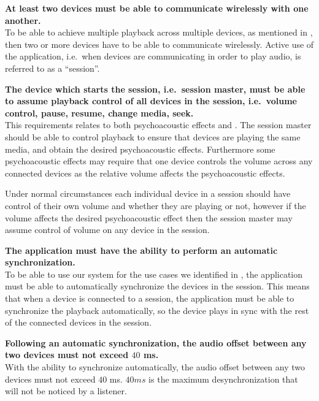 \begin{eletterate}
    \item\label{req:wireless} \textbf{At least two devices must be able to communicate wirelessly with one another.} \hfill\\
        To be able to achieve multiple playback across multiple devices, as mentioned in ,
        then two or more devices have to be able to communicate wirelessly.
        Active use of the application, i.e.~when devices are communicating in order to play audio, is referred to as a ``session''.

    \item\label{req:host_control} \textbf{The device which starts the session, i.e.~session master, must be able to assume playback control of all devices in the session, i.e.~volume control, pause, resume, change media, seek.} \hfill\\
        This requirements relates to both psychoacoustic effects and .
        The session master should be able to control playback to ensure that devices are playing the same media, and obtain the desired psychoacoustic effects.
        Furthermore some psychoacoustic effects may require that one device controls the volume across any connected devices as the relative volume affects the psychoacoustic effects.

        Under normal circumstances each individual device in a session should have control of their own volume and whether they are playing or not, however if the volume affects the desired psychoacoustic effect then the session master may assume control of volume on any device in the session.


    \item\label{req:sync} \textbf{The application must have the ability to perform an automatic synchronization.} \hfill\\
        To be able to use our system for the use cases we identified in ,
        the application must be able to automatically synchronize the devices in the session.
        This means that when a device is connected to a session, the application must be able to synchronize the playback automatically,
        so the device plays in sync with the rest of the connected devices in the session.

    \begin{eletterate}
        \item \textbf{Following an automatic synchronization, the audio offset between any two devices must not exceed $40$ ms.} \hfill\\
            With the ability to synchronize automatically, the audio offset between any two devices must not exceed $40$ ms.
            $40 ms$ is the maximum desynchronization that will not be noticed by a listener.


\end{eletterate}
\end{eletterate}
